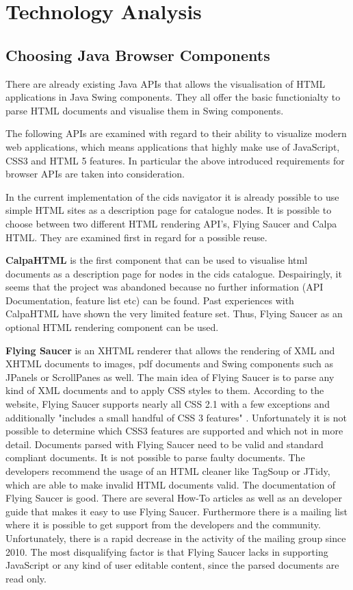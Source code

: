 \chapter{Technology Analysis}\label{chap:tech_analysis}
	
\section{Choosing Java Browser Components}\label{chap:browser_api_comparison}
There are already existing Java APIs that allows the visualisation of HTML applications in Java Swing components.
They all offer the basic functionialty to parse HTML documents and visualise them in Swing components.

The following APIs are examined with regard to their ability to visualize modern web applications, which means applications that highly make use of JavaScript, CSS3 and HTML 5 features.
In particular the above introduced requirements for browser APIs are taken into consideration.

In the current implementation of the cids navigator it is already possible to use simple HTML sites as a description page for catalogue nodes.
It is possible to choose  between two different HTML rendering API's, Flying Saucer and Calpa HTML.
They are examined first in regard for a possible reuse.
 

\textbf{CalpaHTML} is the first component that can be used to visualise html documents as a description page for nodes in the cids catalogue.
Despairingly, it seems that the project was abandoned because no further information (API Documentation, feature list etc) can be found. 
Past experiences with CalpaHTML have shown the very limited feature set.
Thus, Flying Saucer as an optional HTML rendering component can be used.

\textbf{Flying Saucer} is an XHTML renderer that allows the rendering of XML and XHTML documents to images, pdf documents and Swing components such as JPanels or ScrollPanes as well.
The main idea of Flying Saucer is to parse any kind of XML documents and to apply CSS styles to them.
According to the website, Flying Saucer supports nearly all CSS 2.1 with a few exceptions and additionally "includes a small handful of CSS 3 features" \autocite{tech-ana:flying-saucer}.
Unfortunately it is not possible to determine which CSS3 features are supported and which not in more detail.
Documents parsed with Flying Saucer need to be valid and standard compliant documents.
It is not possible to parse faulty documents.
The developers recommend the usage of an HTML cleaner like TagSoup or JTidy, which are able to make invalid HTML documents valid.
The documentation of Flying Saucer is good.
There are several How-To articles as well as an developer guide that makes it easy to use Flying Saucer.
Furthermore there is a mailing list where it is possible to get support from the developers and the community.
Unfortunately, there is a rapid decrease in the activity of the mailing group since 2010.
The most disqualifying factor is that Flying Saucer lacks in supporting JavaScript or any kind of user editable content, since the parsed documents are read only.

